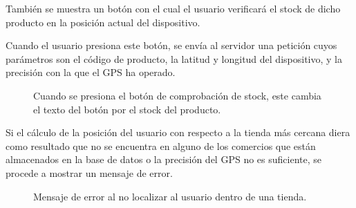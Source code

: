 También se muestra un botón con el cual el usuario verificará el stock de dicho producto en la posición actual del dispositivo.

Cuando el usuario presiona este botón, se envía al servidor una petición cuyos parámetros son el código de producto, la latitud y longitud del dispositivo, y la precisión con la que el GPS ha operado.

\begin{figure}[H]
	\centering
	\caption{Cuando se presiona el botón de comprobación de stock, este cambia el texto del botón por el stock del producto.}
	\label{fig:botonStock}
\end{figure}

Si el cálculo de la posición del usuario con respecto a la tienda más cercana diera como resultado que no se encuentra en alguno de los comercios que están almacenados en la base de datos o la precisión del GPS no es suficiente, se procede a mostrar un mensaje de error.

\begin{figure}[H]
	\centering
	\caption{Mensaje de error al no localizar al usuario dentro de una tienda.}
	\label{fig:errorGPS}
\end{figure}


